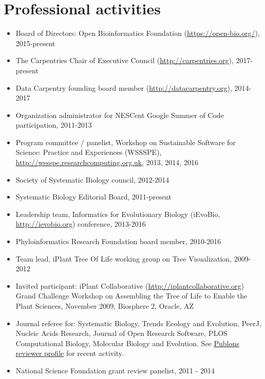 \documentclass[10pt]{article}
\begin{document}
\section*{Professional activities}
\begin{itemize}
\item{Board of Directors: Open Bioinformatics Foundation (\url{https://open-bio.org/}), 2015-present}
\item{The Carpentries Chair of Executive Council (\url{http://carpentries.org}), 2017-present}
\item{Data Carpentry founding board member (\url{http://datacarpentry.org}), 2014-2017}
\item{Organization administrator for NESCent Google Summer of Code participation, 2011-2013}
\item{Program committee / panelist, Workshop on Sustainable Software for Science: Practice and Experiences (WSSSPE), \url{http://wssspe.researchcomputing.org.uk}, 2013, 2014, 2016}
\item{Society of Systematic Biology council, 2012-2014}
\item{Systematic Biology Editorial Board, 2011-present}
\item{Leadership team, Informatics for Evolutionary Biology (iEvoBio, \url{http://ievobio.org}) conference, 2013-2016}
\item{Phyloinformatics Research Foundation board member, 2010-2016}
\item{Team lead, iPlant Tree Of Life working group on Tree Visualization, 2009-2012}
\item{Invited participant: iPlant Collaborative (\url{http://iplantcollaborative.org}) Grand Challenge Workshop on Assembling the Tree of Life to Enable the Plant Sciences, November 2009, Biosphere 2, Oracle, AZ}
\item{Journal referee for: Systematic Biology, Trends Ecology and Evolution, PeerJ, Nucleic Acids Research, Journal of Open Research Software, PLOS Computational Biology, Molecular Biology and Evolution}. See \href{https://publons.com/a/213683/}{Publons reviewer profile} for recent activity. 
\item{National Science Foundation grant review panelist, 2011 - 2014}
\end{itemize}
\end{document}
